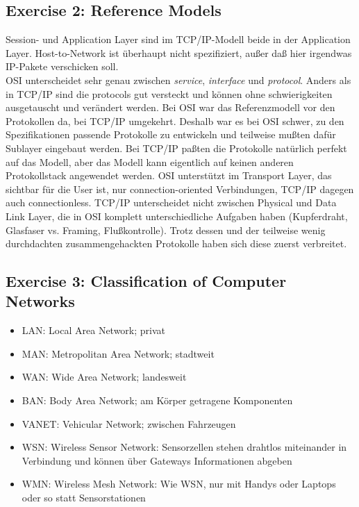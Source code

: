 \documentclass[10pt,a4paper]{scrartcl}
\begin{document}
\subsection*{Exercise 2: Reference Models}
Session- und Application Layer sind im TCP/IP-Modell beide in der Application Layer. Host-to-Network ist überhaupt nicht spezifiziert, außer daß hier irgendwas IP-Pakete verschicken soll.\\
OSI unterscheidet sehr genau zwischen \textit{service}, \textit{interface} und \textit{protocol}. Anders als in TCP/IP sind die protocols gut versteckt und können ohne schwierigkeiten ausgetauscht und verändert werden. Bei OSI war das Referenzmodell vor den Protokollen da, bei TCP/IP umgekehrt. Deshalb war es bei OSI schwer, zu den Spezifikationen passende Protokolle zu entwickeln und teilweise mußten dafür Sublayer eingebaut werden. Bei TCP/IP paßten die Protokolle natürlich perfekt auf das Modell, aber das Modell kann eigentlich auf keinen anderen Protokollstack angewendet werden. OSI unterstützt im Transport Layer, das sichtbar für die User ist, nur connection-oriented Verbindungen, TCP/IP dagegen auch connectionless. TCP/IP unterscheidet nicht zwischen Physical und Data Link Layer, die in OSI komplett unterschiedliche Aufgaben haben (Kupferdraht, Glasfaser vs. Framing, Flußkontrolle). Trotz dessen und der teilweise wenig durchdachten zusammengehackten Protokolle haben sich diese zuerst verbreitet.

\subsection*{Exercise 3: Classification of Computer Networks}
\begin{itemize}
\item LAN: Local Area Network; privat
\item MAN: Metropolitan Area Network; stadtweit
\item WAN: Wide Area Network; landesweit
\item BAN: Body Area Network; am Körper getragene Komponenten
\item VANET: Vehicular Network; zwischen Fahrzeugen
\item WSN: Wireless Sensor Network: Sensorzellen stehen drahtlos miteinander in Verbindung und können über Gateways Informationen abgeben
\item WMN: Wireless Mesh Network: Wie WSN, nur mit Handys oder Laptops oder so statt Sensorstationen
\end{itemize}
\end{document}
